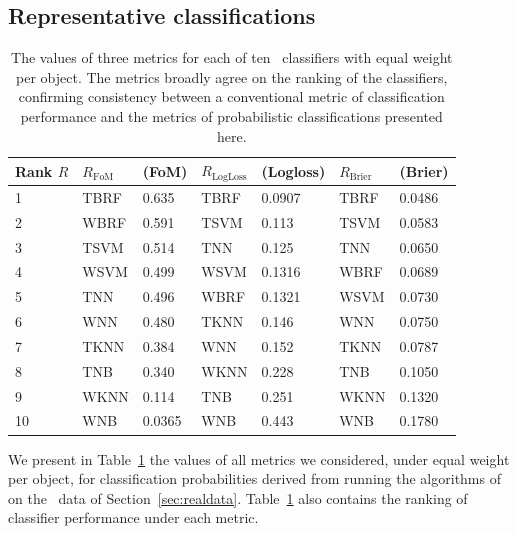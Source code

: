 \subsection{Representative classifications}
\label{sec:realresults}

\begin{centering}
\begin{table}[]
\begin{tabular}{lllllll}%
Rank $R$ & $R_\mathrm{FoM}$ & (FoM) & %
$R_\mathrm{LogLoss}$ & (Logloss) & $R_\mathrm{Brier}$ & (Brier) \\
\hline
1  & TBRF & 0.635  %
& TBRF & 0.0907 & TBRF & 0.0486 \\
2  & WBRF & 0.591  %
& TSVM & 0.113  & TSVM & 0.0583 \\
3  & TSVM & 0.514  %
& TNN  & 0.125  & TNN  & 0.0650 \\
4  & WSVM & 0.499  %
& WSVM & 0.1316 & WBRF & 0.0689 \\
5  & TNN  & 0.496  %
& WBRF & 0.1321 & WSVM & 0.0730 \\
6  & WNN  & 0.480  %
& TKNN & 0.146  & WNN  & 0.0750 \\
7  & TKNN & 0.384  %
& WNN  & 0.152  & TKNN & 0.0787 \\
8  & TNB  & 0.340  %
& WKNN & 0.228  & TNB  & 0.1050 \\
9  & WKNN & 0.114  %
& TNB  & 0.251  & WKNN & 0.1320 \\
10 & WNB  & 0.0365 %
& WNB  & 0.443  & WNB  & 0.1780 \\
\end{tabular}
	\caption{The values of three metrics for each of ten \snmachine\ classifiers with equal weight per object.
	The metrics broadly agree on the ranking of the classifiers, confirming consistency between a conventional metric of classification performance and the metrics of probabilistic classifications presented here.}
	\label{tab:snmachineresults}
\end{table}
\end{centering}

We present in Table~\ref{tab:snmachineresults} the values of all metrics we considered, under equal weight per object, for classification probabilities derived from running the algorithms of \citet{lochner_photometric_2016} on the \snphotcc\ data of Section~\ref{sec:realdata}.
Table~\ref{tab:snmachineresults} also contains the ranking of classifier performance under each metric.

